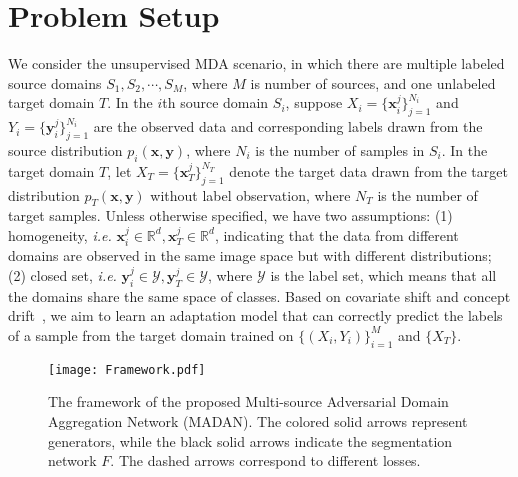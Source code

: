 \documentclass{article}
\begin{document}
\section{Problem Setup}

We consider the unsupervised MDA scenario, in which there are multiple labeled source domains $S_1,S_2,\cdots,S_M$, where $M$ is number of sources, and one unlabeled target domain $T$. In the $i$th source domain $S_i$, suppose $X_i=\{\mathbf{x}_i^j\}_{j=1}^{N_i}$ and $Y_i=\{\mathbf{y}_i^j\}_{j=1}^{N_i}$ are the observed data and corresponding labels drawn from the source distribution $p_i(\mathbf{x}, \mathbf{y})$, where $N_i$ is the number of samples in $S_i$. In the target domain $T$, let $X_T=\{\mathbf{x}_T^j\}_{j=1}^{N_T}$ denote the target data drawn from the target distribution $p_T(\mathbf{x},\mathbf{y})$ without label observation, where $N_T$ is the number of target samples.
Unless otherwise specified, we have two assumptions: (1) homogeneity, \textit{i.e.} $\mathbf{x}_i^j\in \mathbb{R}^{d}, \mathbf{x}_T^j\in \mathbb{R}^{d}$, indicating that the data from different domains are observed in the same image space but with different distributions; (2) closed set, \textit{i.e.} $\mathbf{y}_i^j\in \mathcal{Y}, \mathbf{y}_T^j\in \mathcal{Y}$, where $\mathcal{Y}$ is the label set, which means that all the domains share the same space of classes. Based on covariate shift and concept drift~\cite{patel2015visual}, we aim to learn an adaptation model that can correctly predict the labels of a sample from the target domain trained on $\{(X_i,Y_i)\}_{i=1}^{M}$ and $\{X_T\}$.










\begin{figure}
\centering
\texttt{[image: Framework.pdf]}
\caption{The framework of the proposed Multi-source Adversarial Domain Aggregation Network (MADAN). The colored solid arrows represent generators, while the black solid arrows indicate the segmentation network $F$. The dashed arrows correspond to different losses.}
\label{fig:Framework}
\end{figure}
\end{document}
